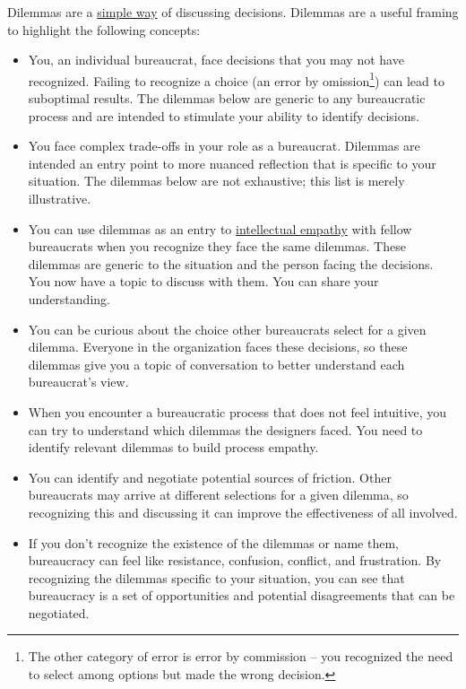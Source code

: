 Dilemmas are a \href{https://en.wikipedia.org/wiki/Defeasible_reasoning}{simple way}
\iftoggle{WPinmargin}{\marginpar{$>$Wikipedia: Defeasible\\reasoning}}{}
of discussing decisions. %
Dilemmas are a useful framing to highlight the following concepts:
\begin{itemize}
    \item You, an individual bureaucrat, face decisions that you may not have recognized. Failing to recognize a choice (an error by omission\footnote{The other category of error is error by commission -- you recognized the need to select among options but made the wrong decision.}) can lead to suboptimal results. The dilemmas below are generic to any bureaucratic process and are intended to stimulate your ability to identify decisions. 
    \item You face complex trade-offs in your role as a bureaucrat. Dilemmas are intended an entry point to more nuanced reflection that is specific to your situation. The dilemmas below are not exhaustive; this list is merely illustrative. 
    \item You can use dilemmas as an entry to \href{https://en.wikipedia.org/wiki/Theory_of_mind}{intellectual empathy} 
    \iftoggle{WPinmargin}{\marginpar{$>$Wikipedia: Theory\\of mind}}{}
    with fellow bureaucrats when you recognize they face the same dilemmas. These dilemmas are generic to the situation and the person facing the decisions. You now have a topic to discuss with them. You can share your understanding. 
    \item You can be curious about the choice other bureaucrats select for a given dilemma. Everyone in the organization faces these decisions, so these dilemmas give you a topic of conversation to better understand each bureaucrat's view.
    \item When you encounter a bureaucratic process that does not feel intuitive, 
    you can try to understand which dilemmas the designers faced. 
    You need to identify relevant dilemmas to build \gls{process empathy}. \iftoggle{glossaryinmargin}{\marginpar{[Glossary]}}{}
    \item You can identify and negotiate potential sources of friction. Other bureaucrats may arrive at different selections for a given dilemma, so recognizing this and discussing it can improve the effectiveness of all involved.
    \item If you don't recognize the existence of the dilemmas or name them, bureaucracy can feel like resistance, confusion, conflict, and frustration. By recognizing the dilemmas specific to your situation, you can see that bureaucracy is  a set of opportunities and potential disagreements that can be negotiated.
\end{itemize}


